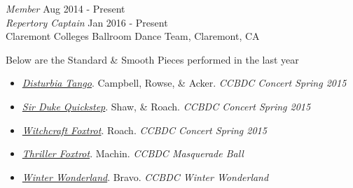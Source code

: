 {\sl Member} \hfill Aug 2014 - Present \\
{\sl Repertory Captain} \hfill Jan 2016 - Present \\
Claremont Colleges Ballroom Dance Team, Claremont, CA

Below are the Standard \& Smooth Pieces performed in the last
year
\begin{itemize} \itemsep -2pt
  \item \textit{\href{https://plus.google.com/photos/+MaxKukartsev/albums/6144495094776534145/6144496212368189842?authkey=CO2G7Y2i9fjypgE&pid=6144496212368189842&oid=115740325087461775740}{Disturbia Tango}}. Campbell, Rowse, \& Acker. \textit{CCBDC Concert Spring 2015}
  \item \textit{\href{https://plus.google.com/photos/+MaxKukartsev/albums/6144495094776534145/6144496834420135650?authkey=CO2G7Y2i9fjypgE&pid=6144496834420135650&oid=115740325087461775740}{Sir Duke Quickstep}}. Shaw, \& Roach. \textit{CCBDC Concert Spring 2015}
  \item \textit{\href{https://plus.google.com/photos/+MaxKukartsev/albums/6144755284449799793/6144756062514880914?authkey=CJ2nnOCmroLAkwE&pid=6144756062514880914&oid=115740325087461775740}{Witchcraft Foxtrot}}. Roach.  \textit{CCBDC Concert Spring 2015}
  \item \textit{\href{https://www.youtube.com/watch?v=UL-5jf3U4wI}{Thriller Foxtrot}}. Machin. \textit{CCBDC Masquerade Ball}
  \item \textit{\href{https://drive.google.com/file/d/0B2WsbhVvHJJyREtBblJ4SWxiWm8/view?usp=sharing}{Winter Wonderland}}. Bravo. \textit{CCBDC Winter Wonderland}
\end{itemize}
